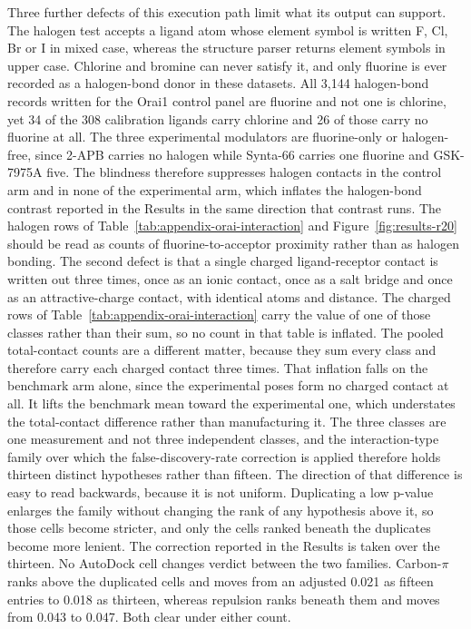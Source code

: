 Three further defects of this execution path limit what its output can support. The halogen test accepts a ligand atom whose element symbol is written F, Cl, Br or I in mixed case, whereas the structure parser returns element symbols in upper case. Chlorine and bromine can never satisfy it, and only fluorine is ever recorded as a halogen-bond donor in these datasets. All 3,144 halogen-bond records written for the Orai1 control panel are fluorine and not one is chlorine, yet 34 of the 308 calibration ligands carry chlorine and 26 of those carry no fluorine at all. The three experimental modulators are fluorine-only or halogen-free, since 2-APB carries no halogen while Synta-66 carries one fluorine and GSK-7975A five. The blindness therefore suppresses halogen contacts in the control arm and in none of the experimental arm, which inflates the halogen-bond contrast reported in the Results in the same direction that contrast runs. The halogen rows of Table~\ref{tab:appendix-orai-interaction} and Figure~\ref{fig:results-r20} should be read as counts of fluorine-to-acceptor proximity rather than as halogen bonding. The second defect is that a single charged ligand-receptor contact is written out three times, once as an ionic contact, once as a salt bridge and once as an attractive-charge contact, with identical atoms and distance. The charged rows of Table~\ref{tab:appendix-orai-interaction} carry the value of one of those classes rather than their sum, so no count in that table is inflated. The pooled total-contact counts are a different matter, because they sum every class and therefore carry each charged contact three times. That inflation falls on the benchmark arm alone, since the experimental poses form no charged contact at all. It lifts the benchmark mean toward the experimental one, which understates the total-contact difference rather than manufacturing it. The three classes are one measurement and not three independent classes, and the interaction-type family over which the false-discovery-rate correction is applied therefore holds thirteen distinct hypotheses rather than fifteen. The direction of that difference is easy to read backwards, because it is not uniform. Duplicating a low p-value enlarges the family without changing the rank of any hypothesis above it, so those cells become stricter, and only the cells ranked beneath the duplicates become more lenient. The correction reported in the Results is taken over the thirteen. No AutoDock cell changes verdict between the two families. Carbon-\ensuremath{\pi} ranks above the duplicated cells and moves from an adjusted 0.021 as fifteen entries to 0.018 as thirteen, whereas repulsion ranks beneath them and moves from 0.043 to 0.047. Both clear under either count.


